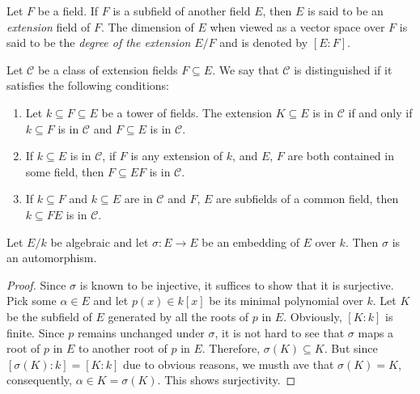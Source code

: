 \begin{definition}
    Let $F$ be a field. If $F$ is a subfield of another field $E$, then $E$ is said to be an \textit{extension} field of $F$. The dimension of $E$ when viewed as a vector space over $F$ is said to be the \textit{degree of the extension} $E/F$ and is denoted by $[E:F]$.
\end{definition}

\begin{definition}
    
\end{definition}


\begin{definition}
    Let $\mathscr{C}$ be a class of extension fields $F\subseteq E$. We say that $\mathscr{C}$ is distinguished if it satisfies the following conditions: 
    \begin{enumerate}
        \item Let $k\subseteq F\subseteq E$ be a tower of fields. The extension $K\subseteq E$ is in $\mathscr{C}$ if and only if $k\subseteq F$ is in $\mathscr{C}$ and $F\subseteq E$ is in $\mathscr{C}$.

        \item If $k\subseteq E$ is in $\mathscr{C}$, if $F$ is any extension of $k$, and $E$, $F$ are both contained in some field, then $F\subseteq EF$ is in $\mathscr{C}$.

        \item If $k\subseteq F$ and $k\subseteq E$ are in $\mathscr{C}$ and $F$, $E$ are subfields of a common field, then $k\subseteq FE$ is in $\mathscr{C}$.
    \end{enumerate}
\end{definition}

\begin{lemma}
    Let $E/k$ be algebraic and let $\sigma: E\to E$ be an embedding of $E$ over $k$. Then $\sigma$ is an automorphism.
\end{lemma}
\begin{proof}
    Since $\sigma$ is known to be injective, it suffices to show that it is surjective. Pick some $\alpha\in E$ and let $p(x)\in k[x]$ be its minimal polynomial over $k$. Let $K$ be the subfield of $E$ generated by all the roots of $p$ in $E$. Obviously, $[K:k]$ is finite. Since $p$ remains unchanged under $\sigma$, it is not hard to see that $\sigma$ maps a root of $p$ in $E$ to another root of $p$ in $E$. Therefore, $\sigma(K)\subseteq K$. But since $[\sigma(K):k] = [K:k]$ due to obvious reasons, we musth ave that $\sigma(K) = K$, consequently, $\alpha\in K = \sigma(K)$. This shows surjectivity.
\end{proof}